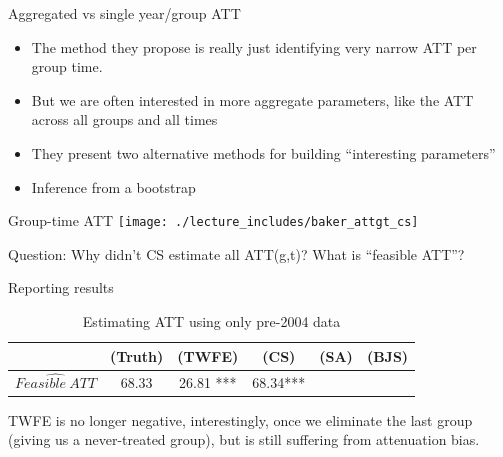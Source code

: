 \documentclass{beamer}
\begin{document}
\begin{frame}{Aggregated vs single year/group ATT}

\begin{itemize}
\item The method they propose is really just identifying very narrow ATT per group time.
\item But we are often interested in  more aggregate parameters, like the ATT across all groups and all times
\item They present two alternative methods for building ``interesting parameters'' 
\item Inference from a bootstrap
\end{itemize}


\end{frame}



\begin{frame}{Group-time ATT }
             \texttt{[image: ./lecture\_includes/baker\_attgt\_cs]}

Question: Why didn't CS estimate all ATT(g,t)? What is ``feasible ATT''?

\end{frame}

\begin{frame}{Reporting results}
\begin{table}[htbp]\centering
\small
\caption{Estimating ATT using only pre-2004 data}
\begin{center}
\begin{tabular}{l*{5}{c}}
\hline
\multicolumn{1}{l}{\textbf{}}&
\multicolumn{1}{c}{\textbf{(Truth)}}&
\multicolumn{1}{c}{\textbf{(TWFE)}}&
\multicolumn{1}{c}{\textbf{(CS)}}&
\multicolumn{1}{c}{\textbf{(SA)}}&
\multicolumn{1}{c}{\textbf{(BJS)}}\\
\hline
$\widehat{Feasible\ ATT}$  & 68.33    & 26.81 *** & 68.34*** &&\\
\hline
\end{tabular}
\end{center}
\end{table}

TWFE is no longer negative, interestingly, once we eliminate the last group (giving us a never-treated group), but is still suffering from attenuation bias. 

\end{frame}
\end{document}
